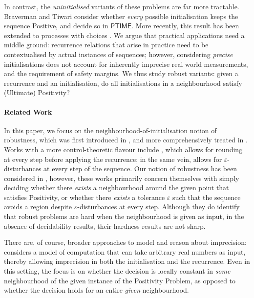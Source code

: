 In contrast, the \textit{uninitialised} variants of these problems are far more tractable. Braverman \cite{Braverman06} and Tiwari \cite{Tiwari04} consider whether \textit{every} possible initialisation keeps the sequence Positive, and decide so in $\mathsf{PTIME}$. More recently, this result has been extended to processes with choices \cite{AGV18}. We argue that practical applications need a middle ground: recurrence relations that arise in practice need to be contextualised by actual instances of sequences; however, considering \textit{precise} initialisations does not account for inherently imprecise real world measurements, and the requirement of safety margins. We thus study robust variants: given a recurrence and an initialisation, do all initialisations in a neighbourhood satisfy (Ultimate) Positivity?

\paragraph*{Related Work} 
In this paper, we focus on the neighbourhood-of-initialisation notion of robustness, which was first introduced in \cite{originalstacs}, and more comprehensively treated in \cite{originalarxiv}.  Works with a more control-theoretic flavour include \cite{rounding20}, which allows for rounding at every step before applying the recurrence; in the same vein, \cite{pseudo21} allows for $\varepsilon$-disturbances at every step of the sequence. Our notion of robustness has been considered in \cite{originalstacs,originalarxiv,pseudo21}, however, these works primarily concern themselves with simply deciding whether there \textit{exists} a neighbourhood around the given point that satisfies Positivity, or whether there \textit{exists} a tolerance $\varepsilon$ such that the sequence avoids a region despite $\varepsilon$-disturbances at every step. Although they do identify that robust problems are hard when the neighbourhood is given as input, in the absence of decidability results, their hardness results are not sharp. 

There are, of course, broader approaches to model and reason about imprecision: \cite{N21} considers a model of computation that can take arbitrary real numbers as input, thereby allowing imprecision in both the initialisation and the recurrence. Even in this setting, the focus is on whether the decision is locally constant in \textit{some} neighbourhood of the given instance of the Positivity Problem, as opposed to whether the decision holds for an entire \textit{given} neighbourhood.

